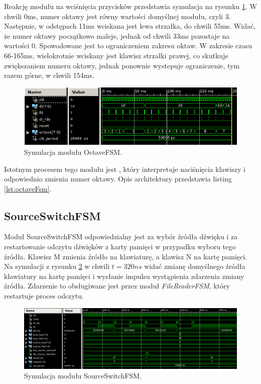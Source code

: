 \documentclass[a4paper,12pt]{article}
\begin{document}
Reakcję modułu na wciśnięcia przycisków przedstawia symulacja na rysunku \ref{sim:octavefsm}. W chwili 0ms, numer oktawy jest równy wartości domyślnej modułu, czyli 3. Następnie, w odstępach 11ms wciskana jest lewa strzałka, do chwili 55ms. Widać, że numer oktawy początkowo maleje, jednak od chwili 33ms pozostaje na wartości 0. Spowodowane jest to ograniczeniem zakresu oktaw. W zakresie czasu 66-165ms, wielokrotnie wciskany jest klawisz strzałki prawej, co skutkuje zwiększaniem numeru oktawy, jednak ponownie wystepuje ograniczenie, tym razem górne, w chwili 154ms.

\begin{figure}[h]
  \centering
  \includegraphics[decodearray={1 0 1 0 1 0}, width=\linewidth]{images/octavefsm.png}
  \caption{Symulacja modułu OctaveFSM.}
  \label{sim:octavefsm}
\end{figure}

Istotnym procesem tego modułu jest , który interpretuje naciśnięcia klawiszy i odpowiednio zmienia numer oktawy.
Opis architektury przedstawia listing \ref{lst:octaveFsm}.


\subsection{SourceSwitchFSM}
Moduł SourceSwitchFSM odpowiedzialny jest za wybór źródła dźwięku i za restartowanie odczytu dźwięków z karty pamięci w przypadku wyboru tego źródła. Klawisz M zmienia źródło na klawiaturę, a klawisz N na kartę pamięci. Na symulacji z rysunku \ref{sim:source} w chwili $t=320ns$ widać zmianę domyślnego źródła klawiatury na kartę pamięci i wysłanie impulsu wystąpienia zdarzenia zmiany źródła. Zdarzenie to obsługiwane jest przez moduł \textit{FileReaderFSM}, który restartuje proces odczytu.
\begin{figure}[h]
  \centering
  \includegraphics[decodearray={1 0 1 0 1 0}, width=\linewidth]{images/source}
  \caption{Symulacja modułu SourceSwitchFSM.}
  \label{sim:source}
\end{figure}
\end{document}
